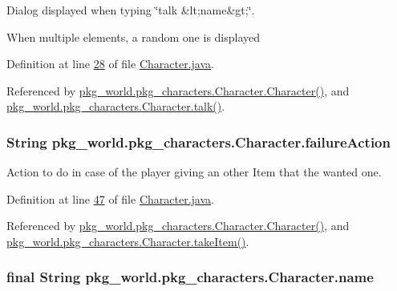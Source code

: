 Dialog displayed when typing \char`\"{}talk \&lt;name\&gt;\char`\"{}. 

When multiple elements, a random one is displayed 

Definition at line \hyperlink{Character_8java_source_l00028}{28} of file \hyperlink{Character_8java_source}{Character.\-java}.



Referenced by \hyperlink{Character_8java_source_l00062}{pkg\-\_\-world.\-pkg\-\_\-characters.\-Character.\-Character()}, and \hyperlink{Character_8java_source_l00105}{pkg\-\_\-world.\-pkg\-\_\-characters.\-Character.\-talk()}.

\hypertarget{classpkg__world_1_1pkg__characters_1_1Character_add959e452ec866785ef0d48f054b13ab}{
\subsubsection[{failure\-Action}]{\setlength{\rightskip}{0pt plus 5cm}String pkg\-\_\-world.\-pkg\-\_\-characters.\-Character.\-failure\-Action\hspace{0.3cm}{\ttfamily [private]}}}\label{classpkg__world_1_1pkg__characters_1_1Character_add959e452ec866785ef0d48f054b13ab}


Action to do in case of the player giving an other Item that the wanted one. 



Definition at line \hyperlink{Character_8java_source_l00047}{47} of file \hyperlink{Character_8java_source}{Character.\-java}.



Referenced by \hyperlink{Character_8java_source_l00086}{pkg\-\_\-world.\-pkg\-\_\-characters.\-Character.\-Character()}, and \hyperlink{Character_8java_source_l00113}{pkg\-\_\-world.\-pkg\-\_\-characters.\-Character.\-take\-Item()}.

\hypertarget{classpkg__world_1_1pkg__characters_1_1Character_a54831aae75fcaacb68cb500a12ffe457}{
\subsubsection[{name}]{\setlength{\rightskip}{0pt plus 5cm}final String pkg\-\_\-world.\-pkg\-\_\-characters.\-Character.\-name\hspace{0.3cm}{\ttfamily [private]}}}\label{classpkg__world_1_1pkg__characters_1_1Character_a54831aae75fcaacb68cb500a12ffe457}


